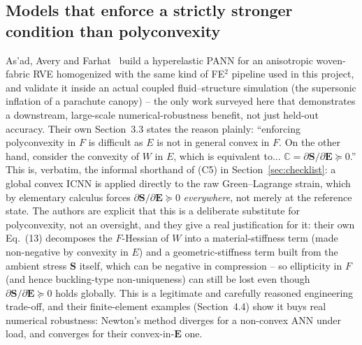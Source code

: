 \documentclass[10pt,a4paper]{article}
\begin{document}
\subsection{Models that enforce a strictly stronger condition than polyconvexity}
\label{sec:related-asad}
As'ad, Avery and Farhat~\cite{Asad2022} build a hyperelastic PANN for an
anisotropic woven-fabric RVE homogenized with the same kind of FE$^2$
pipeline used in this project, and validate it inside an actual coupled
fluid--structure simulation (the supersonic inflation of a parachute
canopy) -- the only work surveyed here that demonstrates a downstream,
large-scale numerical-robustness benefit, not just held-out accuracy.
Their own Section~3.3 states the reason plainly: ``enforcing polyconvexity
in $F$ is difficult as $E$ is not in general convex in $F$. On the other
hand, consider the convexity of $W$ in $E$, which is equivalent to...
$\mathbb C=\partial\bm S/\partial\bm E\succeq0$.'' This is, verbatim, the
informal shorthand of (C5) in Section~\ref{sec:checklist}: a global convex
ICNN is applied directly to the raw Green--Lagrange strain, which by
elementary calculus forces $\partial\bm S/\partial\bm E\succeq0$
\emph{everywhere}, not merely at the reference state. The authors are
explicit that this is a deliberate substitute for polyconvexity, not an
oversight, and they give a real justification for it: their own Eq.~(13)
decomposes the $F$-Hessian of $W$ into a material-stiffness term (made
non-negative by convexity in $E$) and a geometric-stiffness term built
from the ambient stress $\bm S$ itself, which can be negative in
compression -- so ellipticity in $F$ (and hence buckling-type
non-uniqueness) can still be lost even though $\partial\bm S/\partial\bm E
\succeq0$ holds globally. This is a legitimate and carefully reasoned
engineering trade-off, and their finite-element examples (Section~4.4)
show it buys real numerical robustness: Newton's method diverges for a
non-convex ANN under load, and converges for their convex-in-$\bm E$ one.
\end{document}
